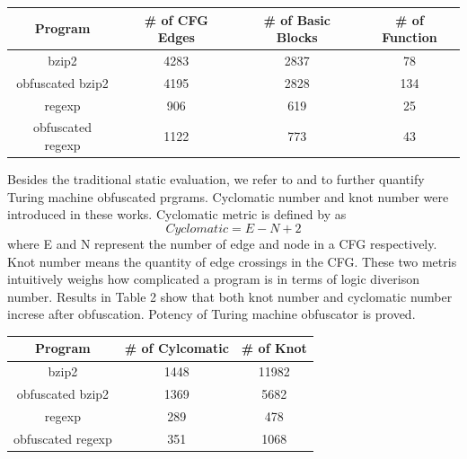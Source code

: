 \documentclass[lnicst]{svmultln}
\begin{document}
\begin{center}
 \begin{tabular}{|c | c | c | c|} 
 \hline 
 Program & \# of CFG Edges & \# of Basic Blocks & \# of Function \\
 \hline
bzip2 & 4283 & 2837 & 78 \\ 
 \hline
obfuscated bzip2 & 4195 & 2828 & 134 \\
 \hline
regexp & 906 & 619 & 25 \\ 
 \hline
obfuscated regexp & 1122 & 773 & 43 \\
 \hline
\end{tabular}
\end{center}

Besides the traditional static evaluation, we refer to \cite{McCabe} and \cite{Woodward} to further quantify Turing machine obfuscated prgrams. Cyclomatic number and knot number were introduced in these works. Cyclomatic metric is defined by as \[ Cyclomatic = E - N + 2 \] where E and N represent the number of edge and node in a CFG respectively. Knot number means the quantity of edge crossings in the CFG. These two metris intuitively weighs how complicated a program is in terms of logic diverison number. Results in Table 2 show that both knot number and cyclomatic number increse after obfuscation. Potency of Turing machine obfuscator is proved.

\begin{center}
 \begin{tabular}{|c | c | c |} 
 \hline 
 Program & \# of Cylcomatic & \# of Knot \\
 \hline
bzip2 & 1448 & 11982  \\ 
 \hline
obfuscated bzip2 & 1369 & 5682  \\
 \hline
regexp & 289 & 478 \\ 
 \hline
obfuscated regexp & 351 & 1068 \\
 \hline
\end{tabular}
\end{center}
\end{document}
